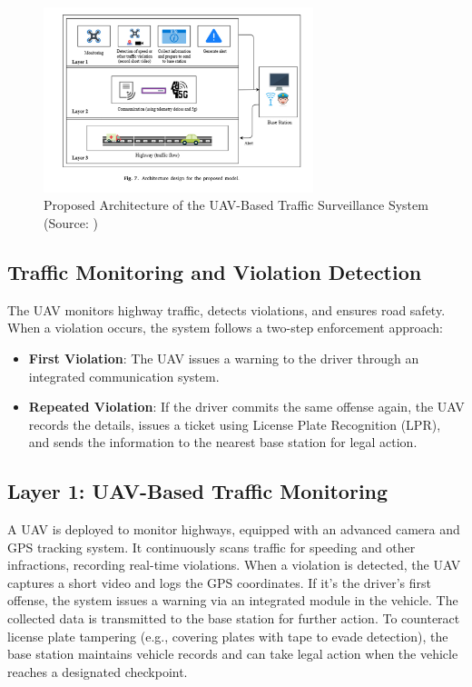 \begin{figure}[H]  %
    \centering
    \includegraphics[width=0.7\textwidth]{Figures/Chapter3/Method3/1.png} %
    \caption{Proposed Architecture of the UAV-Based Traffic Surveillance System (Source: \cite{khan2024smarttraffic})}
    \label{fig:method3_architecture} %
\end{figure}

\vspace{\baselineskip} %

\subsection{Traffic Monitoring and Violation Detection}
The UAV monitors highway traffic, detects violations, and ensures road safety. When a violation occurs, the system follows a two-step enforcement approach:

\begin{itemize}
    \item \textbf{First Violation}: The UAV issues a warning to the driver through an integrated communication system.
    \item \textbf{Repeated Violation}: If the driver commits the same offense again, the UAV records the details, issues a ticket using License Plate Recognition (LPR), and sends the information to the nearest base station for legal action.
\end{itemize}

\vspace{\baselineskip} %

\subsection{Layer 1: UAV-Based Traffic Monitoring}
A UAV is deployed to monitor highways, equipped with an advanced camera and GPS tracking system. It continuously scans traffic for speeding and other infractions, recording real-time violations. When a violation is detected, the UAV captures a short video and logs the GPS coordinates. If it’s the driver’s first offense, the system issues a warning via an integrated module in the vehicle. The collected data is transmitted to the base station for further action. To counteract license plate tampering (e.g., covering plates with tape to evade detection), the base station maintains vehicle records and can take legal action when the vehicle reaches a designated checkpoint.

